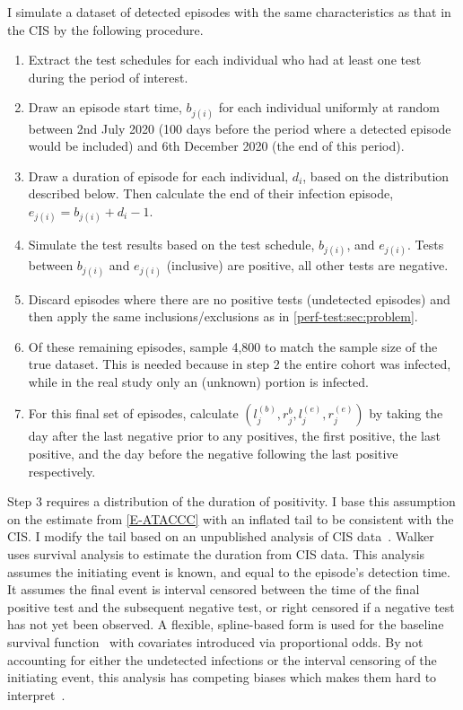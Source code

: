 \documentclass[thesis.tex]{subfiles}
\begin{document}
I simulate a dataset of detected episodes with the same characteristics as that in the CIS by the following procedure.
\begin{enumerate}
    \item Extract the test schedules for each individual who had at least one test during the period of interest.
    \item Draw an episode start time, $b_{j(i)}$ for each individual uniformly at random between 2nd July 2020 (100 days before the period where a detected episode would be included) and 6th December 2020 (the end of this period).
    \item Draw a duration of episode for each individual, $d_i$, based on the distribution described below. Then calculate the end of their infection episode, $e_{j(i)} = b_{j(i)} + d_i - 1$.
    \item Simulate the test results based on the test schedule, $b_{j(i)}$, and $e_{j(i)}$. Tests between $b_{j(i)}$ and $e_{j(i)}$ (inclusive) are positive, all other tests are negative.
    \item Discard episodes where there are no positive tests (\ie undetected episodes) and then apply the same inclusions/exclusions as in \cref{perf-test:sec:problem}.
    \item Of these remaining episodes, sample 4,800 to match the sample size of the true dataset. This is needed because in step 2 the entire cohort was infected, while in the real study only an (unknown) portion is infected.
    \item For this final set of episodes, calculate $(l_j^{(b)}, r_j^{b}, l_j^{(e)}, r_j^{(e)})$ by taking the day after the last negative prior to any positives, the first positive, the last positive, and the day before the negative following the last positive respectively.
\end{enumerate}

Step 3 requires a distribution of the duration of positivity.
I base this assumption on the estimate from \cref{E-ATACCC} with an inflated tail to be consistent with the CIS.
I modify the tail based on an unpublished analysis of CIS data~.
Walker uses survival analysis to estimate the duration from CIS data.
This analysis assumes the initiating event is known, and equal to the episode’s detection time. 
It assumes the final event is interval censored between the time of the final positive test and the subsequent negative test, or right censored if a negative test has not yet been observed.
A flexible, spline-based form is used for the baseline survival function~\autocite{roystonSTPM,roystonFlexible} with covariates introduced via proportional odds.
By not accounting for either the undetected infections or the interval censoring of the initiating event, this analysis has competing biases which makes them hard to interpret~\autocite{cisMethodsONS}.
\end{document}
